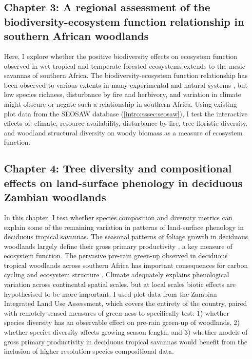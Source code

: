 \begin{refsection}
\subsection{Chapter 3: A regional assessment of the biodiversity-ecosystem function relationship in southern African woodlands}
\label{intro:ssec:chp3}

Here, I explore whether the positive biodiversity effects on ecosystem function observed in wet tropical and temperate forested ecosystems extends to the mesic savannas of southern Africa. The biodiversity-ecosystem function relationship has been observed to various extents in many experimental and natural systems \citep{Tilman2014, Plas2019}, but low species richness, disturbance by fire and herbivory, and variation in climate might obscure or negate such a relationship in southern Africa. Using existing plot data from the SEOSAW database (\autoref{intro:sssec:seosaw}), I test the interactive effects of: climate, resource availability, disturbance by fire, tree floristic diversity, and woodland structural diversity on woody biomass as a measure of ecosystem function.

\subsection{Chapter 4: Tree diversity and compositional effects on land-surface phenology in deciduous Zambian woodlands}
\label{intro:ssec:chp4}

In this chapter, I test whether species composition and diversity metrics can explain some of the remaining variation in patterns of land-surface phenology in deciduous tropical savannas. The seasonal patterns of foliage growth in deciduous woodlands largely define their gross primary productivity \citep{Penuelas2009}, a key measure of ecosystem function. The pervasive pre-rain green-up observed in deciduous tropical woodlands across southern Africa \citep{Ryan2016} has important consequences for carbon cycling and ecosystem structure \citep{Xia2015}. Climate adequately explains phenological variation across continental spatial scales, but at local scales biotic effects are hypothesised to be more important. I used plot data from the Zambian Integrated Land Use Assessment, which covers the entirety of the country, paired with remotely-sensed measures of green-ness to specifically test: 1) whether species diversity has an observable effect on pre-rain green-up of woodlands, 2) whether species diversity affects growing season length, and 3) whether models of gross primary productivity in deciduous tropical savannas would benefit from the inclusion of higher resolution species compositional data.


\end{refsection}

